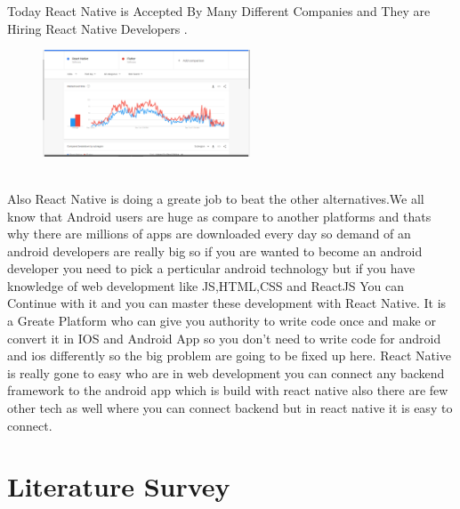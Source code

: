 \documentclass[12pt,a4paper]{article}
\begin{document}
Today React Native is Accepted By Many Different Companies and They are Hiring React Native Developers . \\
\begin{figure}[h]
    \centering
    \includegraphics[width=0.55\textwidth]{react_trends}
\end{figure}
\\
 \qquad Also React Native is doing a greate job to beat the other alternatives.We all know that Android users are huge as compare to another platforms and thats why there are millions of apps are downloaded every day so demand of an android developers are really big so if you are wanted to become an android developer you need to pick a perticular android technology but if you have knowledge of web development like JS,HTML,CSS and ReactJS You can Continue with it and you can master these development with React Native. It is a Greate Platform who can give you authority to write code once and make or convert it in IOS and Android App so you don't need to write code for android and ios differently so the big problem are going to be fixed up here. React Native is really gone to easy who are in web development you can connect any backend framework to the android app which is build with react native also there are few other tech as well where you can connect backend but in react native it is easy to connect.

\newpage

\section*{Literature Survey}
\end{document}
